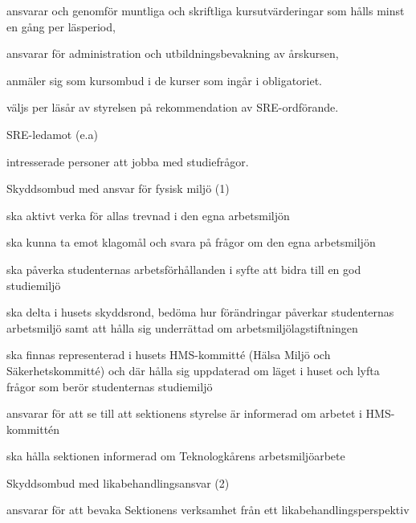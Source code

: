 \documentclass[10pt]{article}
\begin{document}
\begin{emptylist}
        \begin{dashlist}
            \item ansvarar och genomför muntliga och skriftliga
                kursutvärderingar som hålls minst en gång per läsperiod,
            \item ansvarar för administration och utbildningsbevakning av
                årskursen,
            \item anmäler sig som kursombud i de kurser som ingår i
                obligatoriet.
             \item väljs per läsår av styrelsen på rekommendation av SRE-ordförande.
        \end{dashlist}
    \item SRE-ledamot (e.a)
        \begin{dashlist}
            \item intresserade personer att jobba med studiefrågor.
        \end{dashlist}
    \item Skyddsombud med ansvar för fysisk miljö (1)
        \begin{dashlist}
            \item ska aktivt verka för allas trevnad i den egna arbetsmiljön
            \item ska kunna ta emot klagomål och svara på frågor om den egna arbetsmiljön
            \item ska påverka studenternas arbetsförhållanden i syfte att bidra till en god studiemiljö
            \item ska delta i husets skyddsrond, bedöma hur förändringar påverkar studenternas arbetsmiljö samt att
hålla sig underrättad om arbetsmiljölagstiftningen
			\item ska finnas representerad i husets HMS-kommitté (Hälsa Miljö och Säkerhetskommitté) och där hålla
sig uppdaterad om läget i huset och lyfta frågor som berör studenternas studiemiljö
			\item ansvarar för att se till att sektionens styrelse är informerad om arbetet i HMS-kommittén
			\item ska hålla sektionen informerad om Teknologkårens arbetsmiljöarbete
        \end{dashlist}
    \item Skyddsombud med likabehandlingsansvar (2)
        \begin{dashlist}
            \item ansvarar för att bevaka Sektionens verksamhet från ett likabehandlingsperspektiv

\end{dashlist}
\end{emptylist}
\end{document}
